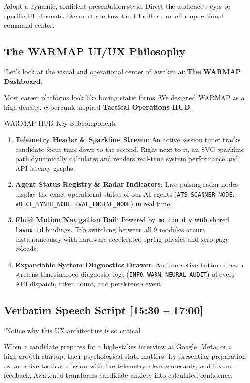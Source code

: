 \documentclass[11pt,a4paper]{article}
\begin{document}
\begin{speakercue}{Adopt a dynamic, confident presentation style. Direct the audience's eyes to specific UI elements.}
Demonstrate how the UI reflects an elite operational command center.
\end{speakercue}

\subsection{The WARMAP UI/UX Philosophy}
`Let's look at the visual and operational center of Awaken.ai: \textbf{The WARMAP Dashboard}.

Most career platforms look like boring static forms. We designed WARMAP as a high-density, cyberpunk-inspired \textbf{Tactical Operations HUD}.

\begin{techbox}{WARMAP HUD Key Subcomponents}
\begin{enumerate}[leftmargin=*]
    \item \textbf{Telemetry Header \& Sparkline Stream}: An active session timer tracks candidate focus time down to the second. Right next to it, an SVG sparkline path dynamically calculates and renders real-time system performance and API latency graphs.
    \item \textbf{Agent Status Registry \& Radar Indicators}: Live pulsing radar nodes display the exact operational status of our AI agents (\texttt{ATS\_SCANNER\_NODE}, \texttt{VOICE\_SYNTH\_NODE}, \texttt{EVAL\_ENGINE\_NODE}) in real time.
    \item \textbf{Fluid Motion Navigation Rail}: Powered by \texttt{motion.div} with shared \texttt{layoutId} bindings. Tab switching between all 9 modules occurs instantaneously with hardware-accelerated spring physics and zero page reloads.
    \item \textbf{Expandable System Diagnostics Drawer}: An interactive bottom drawer streams timestamped diagnostic logs (\texttt{INFO}, \texttt{WARN}, \texttt{NEURAL\_AUDIT}) of every API dispatch, token count, and persistence event.
\end{enumerate}
\end{techbox}

\subsection{Verbatim Speech Script [15:30 -- 17:00]}
`Notice why this UX architecture is so critical:

When a candidate prepares for a high-stakes interview at Google, Meta, or a high-growth startup, their psychological state matters. By presenting preparation as an active tactical mission with live telemetry, clear scorecards, and instant feedback, Awaken.ai transforms candidate anxiety into calculated confidence.
\end{document}
